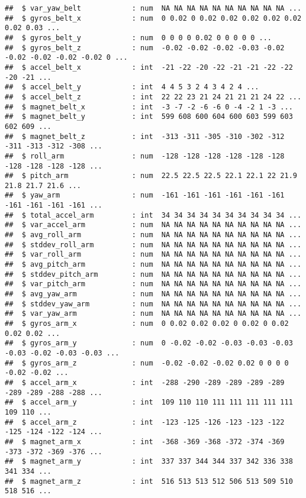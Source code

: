 \documentclass[
]{article}
\begin{document}
\begin{verbatim}
##  $ var_yaw_belt            : num  NA NA NA NA NA NA NA NA NA NA ...
##  $ gyros_belt_x            : num  0 0.02 0 0.02 0.02 0.02 0.02 0.02 0.02 0.03 ...
##  $ gyros_belt_y            : num  0 0 0 0 0.02 0 0 0 0 0 ...
##  $ gyros_belt_z            : num  -0.02 -0.02 -0.02 -0.03 -0.02 -0.02 -0.02 -0.02 -0.02 0 ...
##  $ accel_belt_x            : int  -21 -22 -20 -22 -21 -21 -22 -22 -20 -21 ...
##  $ accel_belt_y            : int  4 4 5 3 2 4 3 4 2 4 ...
##  $ accel_belt_z            : int  22 22 23 21 24 21 21 21 24 22 ...
##  $ magnet_belt_x           : int  -3 -7 -2 -6 -6 0 -4 -2 1 -3 ...
##  $ magnet_belt_y           : int  599 608 600 604 600 603 599 603 602 609 ...
##  $ magnet_belt_z           : int  -313 -311 -305 -310 -302 -312 -311 -313 -312 -308 ...
##  $ roll_arm                : num  -128 -128 -128 -128 -128 -128 -128 -128 -128 -128 ...
##  $ pitch_arm               : num  22.5 22.5 22.5 22.1 22.1 22 21.9 21.8 21.7 21.6 ...
##  $ yaw_arm                 : num  -161 -161 -161 -161 -161 -161 -161 -161 -161 -161 ...
##  $ total_accel_arm         : int  34 34 34 34 34 34 34 34 34 34 ...
##  $ var_accel_arm           : num  NA NA NA NA NA NA NA NA NA NA ...
##  $ avg_roll_arm            : num  NA NA NA NA NA NA NA NA NA NA ...
##  $ stddev_roll_arm         : num  NA NA NA NA NA NA NA NA NA NA ...
##  $ var_roll_arm            : num  NA NA NA NA NA NA NA NA NA NA ...
##  $ avg_pitch_arm           : num  NA NA NA NA NA NA NA NA NA NA ...
##  $ stddev_pitch_arm        : num  NA NA NA NA NA NA NA NA NA NA ...
##  $ var_pitch_arm           : num  NA NA NA NA NA NA NA NA NA NA ...
##  $ avg_yaw_arm             : num  NA NA NA NA NA NA NA NA NA NA ...
##  $ stddev_yaw_arm          : num  NA NA NA NA NA NA NA NA NA NA ...
##  $ var_yaw_arm             : num  NA NA NA NA NA NA NA NA NA NA ...
##  $ gyros_arm_x             : num  0 0.02 0.02 0.02 0 0.02 0 0.02 0.02 0.02 ...
##  $ gyros_arm_y             : num  0 -0.02 -0.02 -0.03 -0.03 -0.03 -0.03 -0.02 -0.03 -0.03 ...
##  $ gyros_arm_z             : num  -0.02 -0.02 -0.02 0.02 0 0 0 0 -0.02 -0.02 ...
##  $ accel_arm_x             : int  -288 -290 -289 -289 -289 -289 -289 -289 -288 -288 ...
##  $ accel_arm_y             : int  109 110 110 111 111 111 111 111 109 110 ...
##  $ accel_arm_z             : int  -123 -125 -126 -123 -123 -122 -125 -124 -122 -124 ...
##  $ magnet_arm_x            : int  -368 -369 -368 -372 -374 -369 -373 -372 -369 -376 ...
##  $ magnet_arm_y            : int  337 337 344 344 337 342 336 338 341 334 ...
##  $ magnet_arm_z            : int  516 513 513 512 506 513 509 510 518 516 ...

\end{verbatim}
\end{document}
